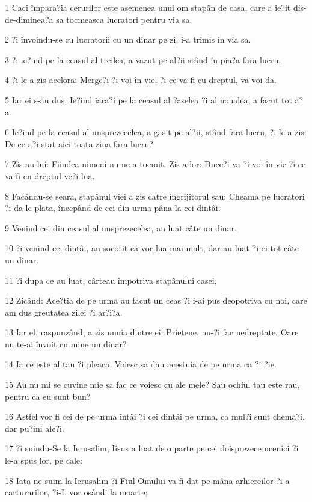 \par 1 Caci împara?ia cerurilor este asemenea unui om stapân de casa, care a ie?it dis-de-diminea?a sa tocmeasca lucratori pentru via sa.
\par 2 ?i învoindu-se cu lucratorii cu un dinar pe zi, i-a trimis în via sa.
\par 3 ?i ie?ind pe la ceasul al treilea, a vazut pe al?ii stând în pia?a fara lucru.
\par 4 ?i le-a zis acelora: Merge?i ?i voi în vie, ?i ce va fi cu dreptul, va voi da.
\par 5 Iar ei s-au dus. Ie?ind iara?i pe la ceasul al ?aselea ?i al noualea, a facut tot a?a.
\par 6 Ie?ind pe la ceasul al unsprezecelea, a gasit pe al?ii, stând fara lucru, ?i le-a zis: De ce a?i stat aici toata ziua fara lucru?
\par 7 Zis-au lui: Fiindca nimeni nu ne-a tocmit. Zis-a lor: Duce?i-va ?i voi în vie ?i ce va fi cu dreptul ve?i lua.
\par 8 Facându-se seara, stapânul viei a zis catre îngrijitorul sau: Cheama pe lucratori ?i da-le plata, începând de cei din urma pâna la cei dintâi.
\par 9 Venind cei din ceasul al unsprezecelea, au luat câte un dinar.
\par 10 ?i venind cei dintâi, au socotit ca vor lua mai mult, dar au luat ?i ei tot câte un dinar.
\par 11 ?i dupa ce au luat, cârteau împotriva stapânului casei,
\par 12 Zicând: Ace?tia de pe urma au facut un ceas ?i i-ai pus deopotriva cu noi, care am dus greutatea zilei ?i ar?i?a.
\par 13 Iar el, raspunzând, a zis unuia dintre ei: Prietene, nu-?i fac nedreptate. Oare nu te-ai învoit cu mine un dinar?
\par 14 Ia ce este al tau ?i pleaca. Voiesc sa dau acestuia de pe urma ca ?i ?ie.
\par 15 Au nu mi se cuvine mie sa fac ce voiesc cu ale mele? Sau ochiul tau este rau, pentru ca eu sunt bun?
\par 16 Astfel vor fi cei de pe urma întâi ?i cei dintâi pe urma, ca mul?i sunt chema?i, dar pu?ini ale?i.
\par 17 ?i suindu-Se la Ierusalim, Iisus a luat de o parte pe cei doisprezece ucenici ?i le-a spus lor, pe cale:
\par 18 Iata ne suim la Ierusalim ?i Fiul Omului va fi dat pe mâna arhiereilor ?i a carturarilor, ?i-L vor osândi la moarte;
